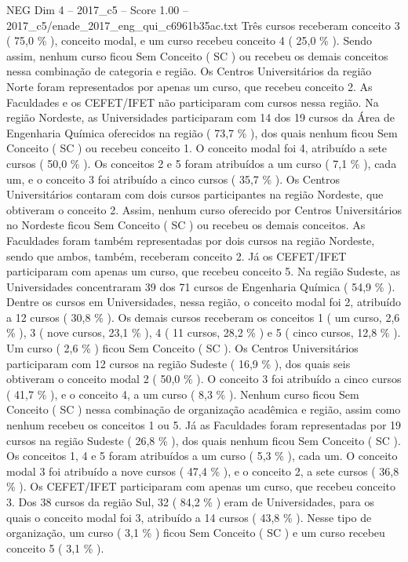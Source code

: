 \begin{textsample}{NEG Dim 4 – 2017\_c5 – Score 1.00 – 2017\_c5/enade\_2017\_eng\_qui\_c6961b35ac.txt}
Três cursos receberam conceito 3 ( 75,0 \% ), conceito modal, e um curso recebeu conceito 4 ( 25,0 \% ).
Sendo assim, nenhum curso ficou Sem Conceito ( SC ) ou recebeu os demais conceitos nessa combinação de categoria e região.
Os Centros Universitários da região Norte foram representados por apenas um curso, que recebeu conceito 2.
As Faculdades e os CEFET/IFET não participaram com cursos nessa região.
Na região Nordeste, as Universidades participaram com 14 dos 19 cursos da Área de Engenharia Química oferecidos na região ( 73,7 \% ), dos quais nenhum ficou Sem Conceito ( SC ) ou recebeu conceito 1.
O conceito modal foi 4, atribuído a sete cursos ( 50,0 \% ).
Os conceitos 2 e 5 foram atribuídos a um curso ( 7,1 \% ), cada um, e o conceito 3 foi atribuído a cinco cursos ( 35,7 \% ).
Os Centros Universitários contaram com dois cursos participantes na região Nordeste, que obtiveram o conceito 2.
Assim, nenhum curso oferecido por Centros Universitários no Nordeste ficou Sem Conceito ( SC ) ou recebeu os demais conceitos.
As Faculdades foram também representadas por dois cursos na região Nordeste, sendo que ambos, também, receberam conceito 2.
Já os CEFET/IFET participaram com apenas um curso, que recebeu conceito 5.
Na região Sudeste, as Universidades concentraram 39 dos 71 cursos de Engenharia Química ( 54,9 \% ).
Dentre os cursos em Universidades, nessa região, o conceito modal foi 2, atribuído a 12 cursos ( 30,8 \% ).
Os demais cursos receberam os conceitos 1 ( um curso, 2,6 \% ), 3 ( nove cursos, 23,1 \% ), 4 ( 11 cursos, 28,2 \% ) e 5 ( cinco cursos, 12,8 \% ).
Um curso ( 2,6 \% ) ficou Sem Conceito ( SC ).
Os Centros Universitários participaram com 12 cursos na região Sudeste ( 16,9 \% ), dos quais seis obtiveram o conceito modal 2 ( 50,0 \% ).
O conceito 3 foi atribuído a cinco cursos ( 41,7 \% ), e o conceito 4, a um curso ( 8,3 \% ).
Nenhum curso ficou Sem Conceito ( SC ) nessa combinação de organização acadêmica e região, assim como nenhum recebeu os conceitos 1 ou 5.
Já as Faculdades foram representadas por 19 cursos na região Sudeste ( 26,8 \% ), dos quais nenhum ficou Sem Conceito ( SC ).
Os conceitos 1, 4 e 5 foram atribuídos a um curso ( 5,3 \% ), cada um.
O conceito modal 3 foi atribuído a nove cursos ( 47,4 \% ), e o conceito 2, a sete cursos ( 36,8 \% ).
Os CEFET/IFET participaram com apenas um curso, que recebeu conceito 3.
Dos 38 cursos da região Sul, 32 ( 84,2 \% ) eram de Universidades, para os quais o conceito modal foi 3, atribuído a 14 cursos ( 43,8 \% ).
Nesse tipo de organização, um curso ( 3,1 \% ) ficou Sem Conceito ( SC ) e um curso recebeu conceito 5 ( 3,1 \% ).

\end{textsample}
